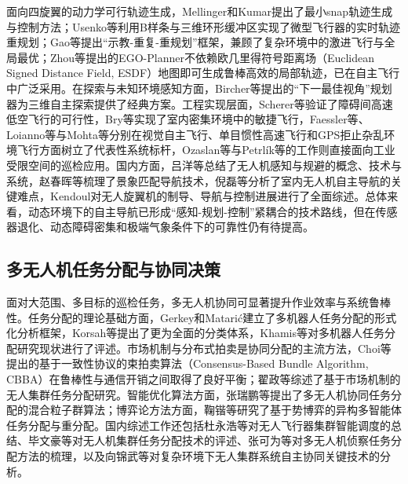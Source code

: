 面向四旋翼的动力学可行轨迹生成，Mellinger和Kumar\cite{mellinger2011minimum}提出了最小snap轨迹生成与控制方法；Usenko等\cite{usenko2017real}利用B样条与三维环形缓冲区实现了微型飞行器的实时轨迹重规划；Gao等提出“示教-重复-重规划”框架，兼顾了复杂环境中的激进飞行与全局最优；Zhou等\cite{zhou2022ego}提出的EGO-Planner不依赖欧几里得符号距离场（Euclidean Signed Distance Field, ESDF）地图即可生成鲁棒高效的局部轨迹，已在自主飞行中广泛采用。在探索与未知环境感知方面，Bircher等\cite{bircher2016receding}提出的“下一最佳视角”规划器为三维自主探索提供了经典方案。工程实现层面，Scherer等\cite{scherer2008flying}验证了障碍间高速低空飞行的可行性，Bry等\cite{bry2015aggressive}实现了室内密集环境中的敏捷飞行，Faessler等\cite{faessler2016autonomous}、Loianno等\cite{loianno2017estimation}与Mohta等\cite{mohta2018fast}分别在视觉自主飞行、单目惯性高速飞行和GPS拒止杂乱环境飞行方面树立了代表性系统标杆，Ozaslan等\cite{ozaslan2017autonomous}与Petrlík等\cite{petrlik2020robust}的工作则直接面向工业受限空间的巡检应用。国内方面，吕洋等\cite{lvyang2019sense}总结了无人机感知与规避的概念、技术与系统，赵春晖等\cite{zhaoch2019review}梳理了景象匹配导航技术，倪磊等\cite{nil2012review}分析了室内无人机自主导航的关键难点，Kendoul\cite{kendoul2012survey}对无人旋翼机的制导、导航与控制进展进行了全面综述。总体来看，动态环境下的自主导航已形成“感知-规划-控制”紧耦合的技术路线，但在传感器退化、动态障碍密集和极端气象条件下的可靠性仍有待提高。

\subsection{多无人机任务分配与协同决策}

面对大范围、多目标的巡检任务，多无人机协同可显著提升作业效率与系统鲁棒性。任务分配的理论基础方面，Gerkey和Matarić\cite{gerkey2004formal}建立了多机器人任务分配的形式化分析框架，Korsah等提出了更为全面的分类体系，Khamis等对多机器人任务分配研究现状进行了评述。市场机制与分布式拍卖是协同分配的主流方法，Choi等提出的基于一致性协议的束拍卖算法（Consensus-Based Bundle Algorithm, CBBA）\cite{choi2009consensus}在鲁棒性与通信开销之间取得了良好平衡；翟政等\cite{zhaiz2023market}综述了基于市场机制的无人集群任务分配研究。智能优化算法方面，张瑞鹏等\cite{zhangrp2022hybrid}提出了多无人机协同任务分配的混合粒子群算法；博弈论方法方面，鞠锴等\cite{jukai2022task}研究了基于势博弈的异构多智能体任务分配与重分配。国内综述工作还包括杜永浩等\cite{duyh2020survey}对无人飞行器集群智能调度的总结、毕文豪等\cite{biwh2024review}对无人机集群任务分配技术的评述、张可为等\cite{zhangkw2021survey}对多无人机侦察任务分配方法的梳理，以及向锦武等\cite{xiangjw2022key}对复杂环境下无人集群系统自主协同关键技术的分析。


